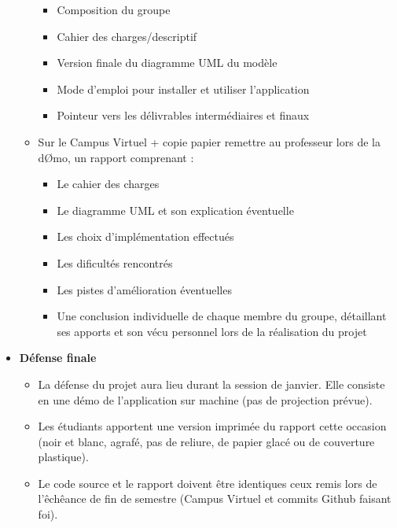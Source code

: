 \begin{itemize}
\begin{itemize}
         \begin{itemize}
             \item Composition du groupe
             \item Cahier des charges/descriptif
             \item Version finale du diagramme UML du modèle
             \item Mode d’emploi pour installer et utiliser l’application
             \item Pointeur vers les délivrables intermédiaires et finaux
         \end{itemize}
         \clearpage
         \item Sur le Campus Virtuel + copie papier remettre au professeur lors de la dØmo, un rapport comprenant :
         \begin{itemize}
             \item Le cahier des charges
             \item Le diagramme UML et son explication éventuelle
             \item Les choix d’implémentation effectués
             \item Les dificultés rencontrés
             \item Les pistes d’amélioration éventuelles
             \item Une conclusion individuelle de chaque membre du groupe, détaillant ses apports et son vécu personnel lors de la réalisation du projet
         \end{itemize}
     \end{itemize}
     \item \textbf{Défense finale}
     \begin{itemize}
         \item La défense du projet aura lieu durant la session de janvier. Elle consiste en une démo de l’application sur machine (pas de projection prévue).
         \item Les étudiants apportent une version imprimée du rapport cette occasion (noir et blanc, agrafé, pas de reliure, de papier glacé ou de couverture plastique).
         \item Le code source et le rapport doivent être identiques ceux remis lors de l’êchêance de fin de semestre (Campus Virtuel et commits Github faisant foi).
     \end{itemize}
\end{itemize}


